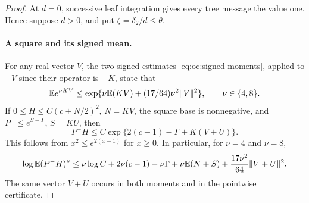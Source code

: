 \begin{proof}
At \(d=0\), successive leaf integration gives every tree message the
value one. Hence suppose \(d>0\), and put \(\zeta=\delta_2/d\le\theta\).

\paragraph{A square and its signed mean.}
For any real vector \(V\), the two signed estimates
\eqref{eq:oc:signed-moments}, applied to \(-V\) since their operator is
\(-K\), state that
\begin{equation}\label{eq:ordinary-root-post:signed}
 \mathbb E e^{\nu KV}\le
 \exp\{\nu\mathbb E(KV)+(17/64)\nu^2\|V\|^2\},\qquad \nu\in\{4,8\}.
\end{equation}
If \(0\le H\le C(c+N/2)^2\), \(N=KV\), the square base is
nonnegative, and \(P^-\le e^{S-\Gamma}\), \(S=KU\), then
\begin{equation}\label{eq:root-post:pointwise}
 P^-H\le
 C\exp\{2(c-1)-\Gamma+K(V+U)\}.
\end{equation}
This follows from \(x^2\le e^{2(x-1)}\) for \(x\ge0\).
In particular, for \(\nu=4\) and \(\nu=8\),
\begin{equation}\label{eq:root-post:signed-payment}
 \log\mathbb E(P^-H)^\nu
 \le \nu\log C+2\nu(c-1)-\nu\Gamma
       +\nu\mathbb E(N+S)+\frac{17\nu^2}{64}\|V+U\|^2 .
\end{equation}
The same vector \(V+U\) occurs in both moments and in the pointwise
certificate.


\end{proof}
